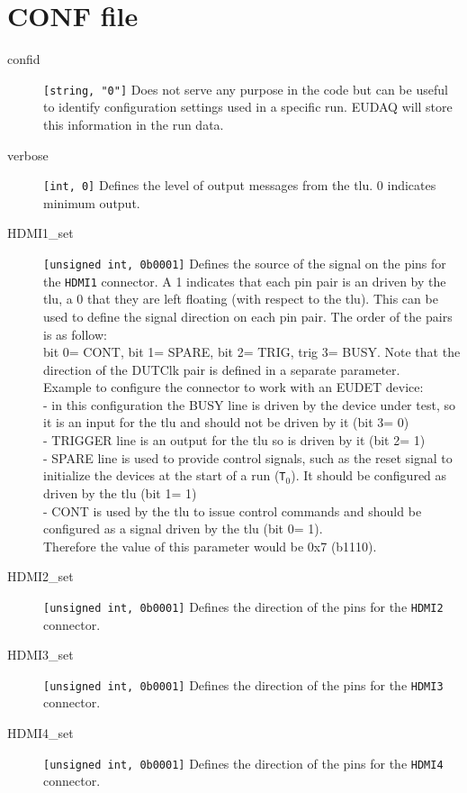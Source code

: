 \section{CONF file}
\begin{description}
  \item[confid] \verb|[string, "0"]| Does not serve any purpose in the code but can be useful to identify configuration settings used in a specific run. EUDAQ will store this information in the run data.
  \item[verbose] \verb|[int, 0]| Defines the level of output messages from the \gls{tlu}. 0 indicates minimum output.
  \item[HDMI1\_set] \verb|[unsigned int, 0b0001]| Defines the source of the signal on the pins for the \verb|HDMI1| connector. A 1 indicates that each pin pair is an driven by the \gls{tlu}, a 0 that they are left floating (with respect to the \gls{tlu}). This can be used to define the signal direction on each pin pair. The order of the pairs is as follow:\\
  bit 0= CONT, bit 1= SPARE, bit 2= TRIG, trig 3= BUSY. Note that the direction of the DUTClk pair is defined in a separate parameter.\\
  Example to configure the connector to work with an EUDET device:\\
  - in this configuration the BUSY line is driven by the device under test, so it is an input for the \gls{tlu} and should not be driven by it (bit 3= 0)\\
  - TRIGGER line is an output for the \gls{tlu} so is driven by it (bit 2= 1)\\
  - SPARE line is used to provide control signals, such as the reset signal to initialize the devices at the start of a run (\texttt{T$_0$}). It should be configured as driven by the \gls{tlu} (bit 1= 1)\\
  - CONT is used by the \gls{tlu} to issue control commands and should be configured as a signal driven by the \gls{tlu} (bit 0= 1).\\
  Therefore the value of this parameter would be 0x7 (b1110).
  \item[HDMI2\_set] \verb|[unsigned int, 0b0001]| Defines the direction of the pins for the \verb|HDMI2| connector.
  \item[HDMI3\_set] \verb|[unsigned int, 0b0001]| Defines the direction of the pins for the \verb|HDMI3| connector.
  \item[HDMI4\_set] \verb|[unsigned int, 0b0001]| Defines the direction of the pins for the \verb|HDMI4| connector.

\end{description}
